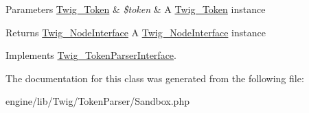 \begin{DoxyParams}[1]{Parameters}
\hyperlink{class_twig___token}{Twig\+\_\+\+Token} & {\em \$token} & A \hyperlink{class_twig___token}{Twig\+\_\+\+Token} instance\\
\hline
\end{DoxyParams}
\begin{DoxyReturn}{Returns}
\hyperlink{interface_twig___node_interface}{Twig\+\_\+\+Node\+Interface} A \hyperlink{interface_twig___node_interface}{Twig\+\_\+\+Node\+Interface} instance 
\end{DoxyReturn}


Implements \hyperlink{interface_twig___token_parser_interface_a5dfa2e269321584fb74e8b43dabe0efd}{Twig\+\_\+\+Token\+Parser\+Interface}.



The documentation for this class was generated from the following file\+:\begin{DoxyCompactItemize}
\item 
engine/lib/\+Twig/\+Token\+Parser/Sandbox.\+php\end{DoxyCompactItemize}
